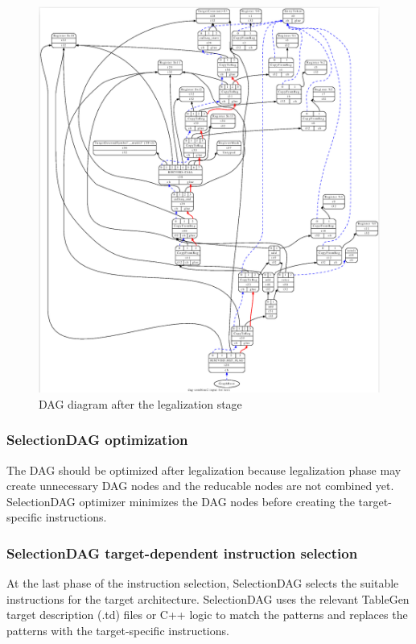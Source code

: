 \begin{figure}
  \centering
  \includegraphics[scale=0.35]{the_llvm_compiler/dag_after_legalization.png}
  \caption{DAG diagram after the legalization stage}
  \label{fig:dag_after_legalization}
\end{figure}

\clearpage
\subsubsection{SelectionDAG optimization}
The DAG should be optimized after legalization because legalization phase may create unnecessary DAG nodes and the reducable nodes are not combined yet. SelectionDAG optimizer minimizes the DAG nodes before creating the target-specific instructions.

\subsubsection{SelectionDAG target-dependent instruction selection}
At the last phase of the instruction selection, SelectionDAG selects the suitable instructions for the target architecture. SelectionDAG uses the relevant TableGen target description (.td) files or C++ logic to match the patterns and replaces the patterns with the target-specific instructions.


